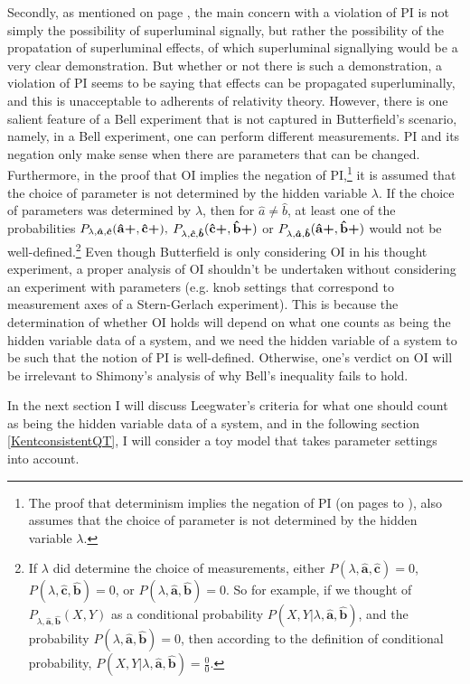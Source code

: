 {Secondly, as mentioned on page \pageref{lambdaknowledge}, the main concern with a violation of PI is not simply the possibility of superluminal signally, but rather the possibility of the propatation of superluminal effects, of which superluminal signallying would be a very clear demonstration. But whether or not there is such a demonstration, a violation of PI seems to be saying that effects can be propagated superluminally, and this is unacceptable to adherents of relativity theory.} However, there is one salient feature of a Bell experiment that is not captured in Butterfield's scenario, namely, in a Bell experiment, one can perform different measurements.  PI and its negation only make sense when there are parameters that can be changed. Furthermore, in the proof that OI implies the negation of PI,\footnote{The proof  that determinism implies the negation of PI (on pages \pageref{bellinequality2} to \pageref{PIdeterminism}), also assumes that the choice of parameter is not determined by the hidden variable $\lambda$.} it is assumed that the choice of parameter is not determined by the hidden variable $\lambda$. If the choice of parameters was determined by $\lambda$, then for $\hat{a}\neq\hat{b}$, at least one of the probabilities $P_{\lambda,\bm{\hat{a}},\bm{\hat{c}}}(\vb{\hat{{a}}}\bm{+},\vb{\hat{{c}}}\bm{+}),$ $P_{\lambda,\bm{\hat{c}},\bm{\hat{b}}}(\vb{\hat{{c}}}\bm{+},\vb{\hat{{b}}}\bm{+})$ or $P_{\lambda,\bm{\hat{a}},\bm{\hat{b}}}(\vb{\hat{{a}}}\bm{+},\vb{\hat{{b}}}\bm{+})$ would not be well-defined.\footnote{If $\lambda$ \label{lambdadetermineprob} did determine the choice of measurements, either $P(\lambda,\bm{\hat{a}},\bm{\hat{c}})=0$, $P(\lambda,\bm{\hat{c}},\bm{\hat{b}})=0$, or $P(\lambda,\bm{\hat{a}},\bm{\hat{b}})=0$. So for example, if we thought of $P_{\lambda,\bm{\hat{a}},\bm{\hat{b}}}(X,Y)$ as a conditional probability $P(X,Y|\lambda,\bm{\hat{a}},\bm{\hat{b}})$, and the probability $P(\lambda,\bm{\hat{a}},\bm{\hat{b}})=0$, then according to the definition of conditional probability,  $P(X,Y|\lambda,\bm{\hat{a}},\bm{\hat{b}})=\frac{0}{0}.$} Even though Butterfield is only considering OI in his thought experiment, a proper analysis of OI shouldn't be undertaken without considering an experiment with parameters (e.g. knob settings that correspond to measurement axes of a Stern-Gerlach experiment). This is because the determination of whether OI holds will depend on what one counts as being the hidden variable data of a system, and we need the hidden variable of a system to be such that the notion of PI is well-defined. Otherwise, one's verdict on OI will be irrelevant to Shimony's analysis of why Bell's inequality fails to hold. 

In the next section I will discuss Leegwater's criteria for what one should count as being the hidden variable data of a system, and in the following section \ref{KentconsistentQT}, I will consider a toy model that takes parameter settings into account.

